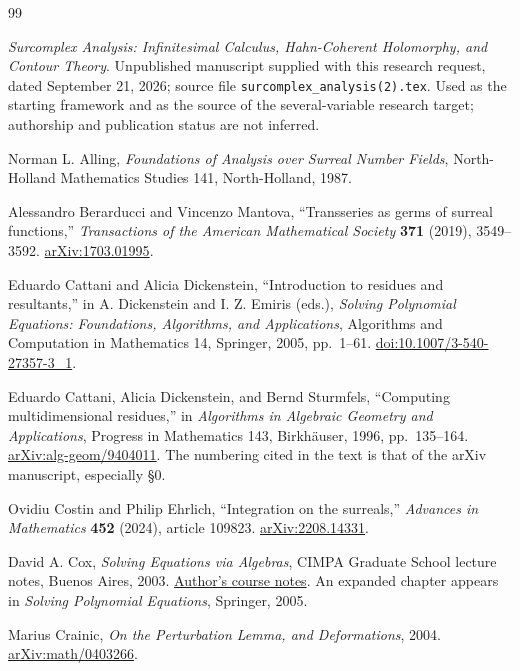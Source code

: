 \documentclass[11pt,letterpaper]{article}
\theoremstyle{definition}
\theoremstyle{remark}
\numberwithin{equation}{section}
\begin{document}
\begin{thebibliography}{99}
\emph{Surcomplex Analysis: Infinitesimal Calculus, Hahn-Coherent Holomorphy, and Contour Theory}.
Unpublished manuscript supplied with this research request, dated September 21, 2026;
source file \texttt{surcomplex\_analysis(2).tex}.
Used as the starting framework and as the source of the several-variable research target; authorship and publication status are not inferred.

Norman L. Alling,
\emph{Foundations of Analysis over Surreal Number Fields},
North-Holland Mathematics Studies 141, North-Holland, 1987.

Alessandro Berarducci and Vincenzo Mantova,
``Transseries as germs of surreal functions,''
\emph{Transactions of the American Mathematical Society} \textbf{371} (2019), 3549--3592.
\href{https://arxiv.org/abs/1703.01995}{arXiv:1703.01995}.

Eduardo Cattani and Alicia Dickenstein,
``Introduction to residues and resultants,''
in A. Dickenstein and I. Z. Emiris (eds.),
\emph{Solving Polynomial Equations: Foundations, Algorithms, and Applications},
Algorithms and Computation in Mathematics 14, Springer, 2005, pp.~1--61.
\href{https://doi.org/10.1007/3-540-27357-3_1}{doi:10.1007/3-540-27357-3\_1}.

Eduardo Cattani, Alicia Dickenstein, and Bernd Sturmfels,
``Computing multidimensional residues,''
in \emph{Algorithms in Algebraic Geometry and Applications},
Progress in Mathematics 143, Birkh\"auser, 1996, pp.~135--164.
\href{https://arxiv.org/abs/alg-geom/9404011}{arXiv:alg-geom/9404011}.
The numbering cited in the text is that of the arXiv manuscript, especially \S0.

Ovidiu Costin and Philip Ehrlich,
``Integration on the surreals,''
\emph{Advances in Mathematics} \textbf{452} (2024), article 109823.
\href{https://arxiv.org/abs/2208.14331}{arXiv:2208.14331}.

David A. Cox,
\emph{Solving Equations via Algebras},
CIMPA Graduate School lecture notes, Buenos Aires, 2003.
\href{https://mate.dm.uba.ar/~visita16/cimpa/notes/Cox.pdf}{Author's course notes}.
An expanded chapter appears in \emph{Solving Polynomial Equations}, Springer, 2005.

Marius Crainic,
\emph{On the Perturbation Lemma, and Deformations}, 2004.
\href{https://arxiv.org/abs/math/0403266}{arXiv:math/0403266}.


\end{thebibliography}
\end{document}
